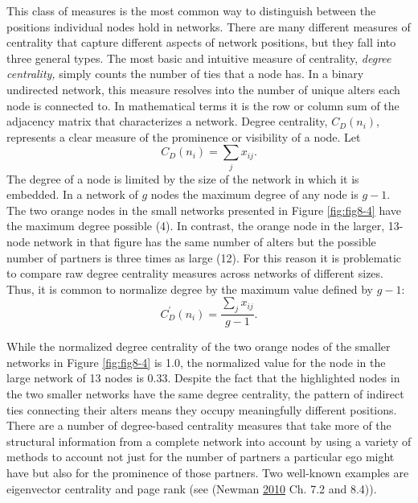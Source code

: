 \documentclass[]{krantz}
\begin{document}
This class of measures is the most common way to distinguish between the
positions individual nodes hold in networks. There are many different
measures of centrality that capture different aspects of network
positions, but they fall into three general types. The most basic and
intuitive measure of centrality, \emph{degree centrality,} simply counts
the number of ties that a node has. In a binary undirected network, this
measure resolves into the number of unique alters each node is connected
to. In mathematical terms it is the row or column sum of the adjacency
matrix that characterizes a network. Degree centrality,
\(C_{D}(n_{i})\), represents a clear measure of the prominence or
visibility of a node. Let \[C_D(n_i)=\sum_jx_{ij}.\] The degree of a
node is limited by the size of the network in which it is embedded. In a
network of \(g\) nodes the maximum degree of any node is \(g-1\). The
two orange nodes in the small networks presented in Figure
\ref{fig:fig8-4} have the maximum degree possible (4). In contrast, the
orange node in the larger, 13-node network in that figure has the same
number of alters but the possible number of partners is three times as
large (12). For this reason it is problematic to compare raw degree
centrality measures across networks of different sizes. Thus, it is
common to normalize degree by the maximum value defined by \(g-1\):
\[C_D^{\prime}(n_i)=\frac{\sum_j x_{ij}}{g-1}.\]

While the normalized degree centrality of the two orange nodes of the
smaller networks in Figure \ref{fig:fig8-4} is 1.0, the normalized value
for the node in the large network of 13 nodes is 0.33. Despite the fact
that the highlighted nodes in the two smaller networks have the same
degree centrality, the pattern of indirect ties connecting their alters
means they occupy meaningfully different positions. There are a number
of degree-based centrality measures that take more of the structural
information from a complete network into account by using a variety of
methods to account not just for the number of partners a particular ego
might have but also for the prominence of those partners. Two well-known
examples are eigenvector centrality and page rank (see (Newman
\protect\hyperlink{ref-newman2010networks}{2010} Ch. 7.2 and 8.4)).
\end{document}
